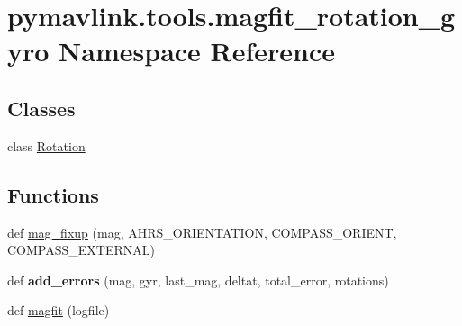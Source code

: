 \hypertarget{namespacepymavlink_1_1tools_1_1magfit__rotation__gyro}{}\section{pymavlink.\+tools.\+magfit\+\_\+rotation\+\_\+gyro Namespace Reference}
\label{namespacepymavlink_1_1tools_1_1magfit__rotation__gyro}
\subsection*{Classes}
\begin{DoxyCompactItemize}
\item 
class \hyperlink{classpymavlink_1_1tools_1_1magfit__rotation__gyro_1_1Rotation}{Rotation}
\end{DoxyCompactItemize}
\subsection*{Functions}
\begin{DoxyCompactItemize}
\item 
def \hyperlink{namespacepymavlink_1_1tools_1_1magfit__rotation__gyro_af1e9e314abb16f339b04627f6de1d866}{mag\+\_\+fixup} (mag, A\+H\+R\+S\+\_\+\+O\+R\+I\+E\+N\+T\+A\+T\+I\+ON, C\+O\+M\+P\+A\+S\+S\+\_\+\+O\+R\+I\+E\+NT, C\+O\+M\+P\+A\+S\+S\+\_\+\+E\+X\+T\+E\+R\+N\+AL)
\item 
\mbox{\label{namespacepymavlink_1_1tools_1_1magfit__rotation__gyro_ace75078283945a476e29455cef312625}} 
def {\bfseries add\+\_\+errors} (mag, gyr, last\+\_\+mag, deltat, total\+\_\+error, rotations)
\item 
def \hyperlink{namespacepymavlink_1_1tools_1_1magfit__rotation__gyro_ae8efb99d4a985344c87bdda430c85b7c}{magfit} (logfile)
\end{DoxyCompactItemize}
